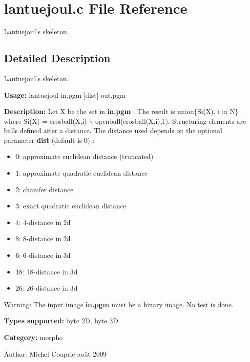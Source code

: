 \section{lantuejoul.c File Reference}
\label{lantuejoul_8c}
Lantuejoul's skeleton. 



\subsection{Detailed Description}
Lantuejoul's skeleton. 

{\bf Usage:} lantuejoul in.pgm [dist] out.pgm

{\bf Description:} Let X be the set in {\bf in.pgm} . The result is union\{Si(X), i in N\} where Si(X) = erosball(X,i) $\backslash$ openball(erosball(X,i),1). Structuring elements are balls defined after a distance. The distance used depends on the optional parameter {\bf dist} (default is 0) : \begin{itemize}
\item 0: approximate euclidean distance (truncated) \item 1: approximate quadratic euclidean distance \item 2: chamfer distance \item 3: exact quadratic euclidean distance \item 4: 4-distance in 2d \item 8: 8-distance in 2d \item 6: 6-distance in 3d \item 18: 18-distance in 3d \item 26: 26-distance in 3d\end{itemize}
\begin{Desc}
\item[Warning:]The input image {\bf in.pgm} must be a binary image. No test is done.\end{Desc}
{\bf Types supported:} byte 2D, byte 3D

{\bf Category:} morpho

\begin{Desc}
\item[Author:]Michel Couprie août 2009 \end{Desc}
